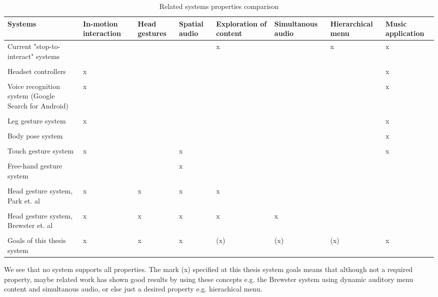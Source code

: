 \begin{table}[t] 
\scriptsize
\caption{Related systems properties comparison} %
\begin{tabular}{L{2.2cm}C{1.5cm}C{1.3cm}C{1.3cm}C{1.5cm}C{1.5cm}C{1.5cm}C{1.5cm}} \toprule
	Systems & In-motion interaction & Head gestures & Spatial audio & Exploration of content & Simultanous audio & Hierarchical menu & Music application \\ \midrule
    Current "stop-to-interact" systems   &  &  &  & x &  & x & x \\
    \\
    Headset controllers   & x &  &  &  &  &  & x \\
    \\
    Voice recognition system (Google Search for Android)   & x &  &  &  &  &  & x \\
    \\
	Leg gesture system \cite{smus_running_2010}   & x &  &  &  &  &  & x \\ %
	\\
	Body pose system \cite{strachan_bodyspace_2007}   &  &   &  &  &  &  & x \\
	\\
	Touch gesture system \cite{pirhonen_gestural_2002}   & x &  & x &  &  &  & x \\
	\\
	Free-hand gesture system \cite{kajastila_interaction_2013}   &  &  & x &  &  &  &  \\
	\\
	Head gesture system, Park et. al \cite{park_gaze-directed_2011}   & x & x & x & x &  &  &  \\
	\\
	Head gesture system, Brewster et. al \cite{brewster_multimodaleyes-freeinteraction_2003}   & x & x & x & x & x &  &   \\
	\\
	Goals of this thesis system   & x & x & x & (x) & (x) & (x) & x \\ \bottomrule
\end{tabular}

\label{tab:related} 
\end{table}

We see that no system supports all properties. The mark (x) specified at this thesis system goals means that although not a required property, maybe related work has shown good results by using these concepts e.g. the Brewster \cite{brewster_multimodaleyes-freeinteraction_2003} system using dynamic auditory menu content and simultanous audio, or else just a desired property e.g. hierachical menu.





